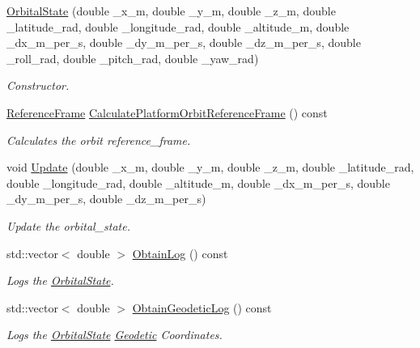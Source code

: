 \begin{DoxyCompactItemize}
\item 
\hyperlink{classosse_1_1collaborate_1_1_orbital_state_a9990f1fc348981b44c1a9c7781cb9b4f}{Orbital\+State} (double \+\_\+x\+\_\+m, double \+\_\+y\+\_\+m, double \+\_\+z\+\_\+m, double \+\_\+latitude\+\_\+rad, double \+\_\+longitude\+\_\+rad, double \+\_\+altitude\+\_\+m, double \+\_\+dx\+\_\+m\+\_\+per\+\_\+s, double \+\_\+dy\+\_\+m\+\_\+per\+\_\+s, double \+\_\+dz\+\_\+m\+\_\+per\+\_\+s, double \+\_\+roll\+\_\+rad, double \+\_\+pitch\+\_\+rad, double \+\_\+yaw\+\_\+rad)
\begin{DoxyCompactList}\small\item\em Constructor. \end{DoxyCompactList}\item 
\hyperlink{classosse_1_1collaborate_1_1_reference_frame}{Reference\+Frame} \hyperlink{classosse_1_1collaborate_1_1_orbital_state_a0ed1213527f9cbe7a6131feb4308046e}{Calculate\+Platform\+Orbit\+Reference\+Frame} () const
\begin{DoxyCompactList}\small\item\em Calculates the orbit reference\+\_\+frame. \end{DoxyCompactList}\item 
void \hyperlink{classosse_1_1collaborate_1_1_orbital_state_a29fea23801f7de2f5ad72888b15ca220}{Update} (double \+\_\+x\+\_\+m, double \+\_\+y\+\_\+m, double \+\_\+z\+\_\+m, double \+\_\+latitude\+\_\+rad, double \+\_\+longitude\+\_\+rad, double \+\_\+altitude\+\_\+m, double \+\_\+dx\+\_\+m\+\_\+per\+\_\+s, double \+\_\+dy\+\_\+m\+\_\+per\+\_\+s, double \+\_\+dz\+\_\+m\+\_\+per\+\_\+s)
\begin{DoxyCompactList}\small\item\em Update the orbital\+\_\+state. \end{DoxyCompactList}\item 
std\+::vector$<$ double $>$ \hyperlink{classosse_1_1collaborate_1_1_orbital_state_a010c89b843916c12e8d6ec4042787af6}{Obtain\+Log} () const
\begin{DoxyCompactList}\small\item\em Logs the \hyperlink{classosse_1_1collaborate_1_1_orbital_state}{Orbital\+State}. \end{DoxyCompactList}\item 
std\+::vector$<$ double $>$ \hyperlink{classosse_1_1collaborate_1_1_orbital_state_a5ef68d5b425411e26612f213ab406136}{Obtain\+Geodetic\+Log} () const
\begin{DoxyCompactList}\small\item\em Logs the \hyperlink{classosse_1_1collaborate_1_1_orbital_state}{Orbital\+State} \hyperlink{classosse_1_1collaborate_1_1_geodetic}{Geodetic} Coordinates. \end{DoxyCompactList}\item 

\end{DoxyCompactItemize}
